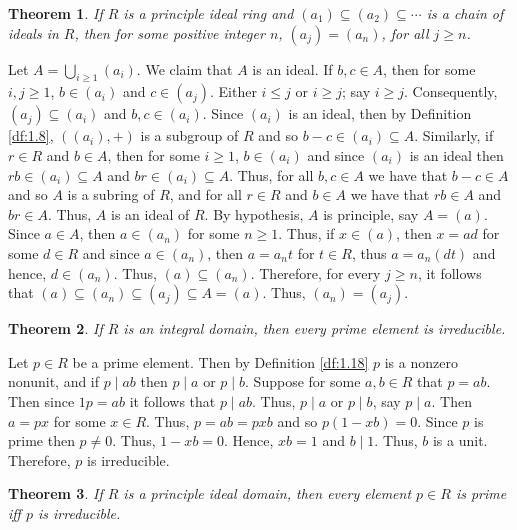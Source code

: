 \documentclass{article}
\makeatletter
\newtheorem{theorem}{Theorem}[section]
\theoremstyle{definition}
\theoremstyle{remark}
\let\oldproofname=\proofname
\renewcommand{\proofname}{\bf{\textit{\oldproofname}}}
\theoremstyle{definition}
\renewenvironment{proof}[1][\proofname]{\par
  \pushQED{\qed}%
  \normalfont \topsep6\p@\@plus6\p@\relax
  \list{}{\leftmargin=0mm
          \rightmargin=0mm
          \settowidth{\itemindent}{\itshape#1}%
          \labelwidth=4mm
          \parsep=0pt \listparindent=0mm%
  }
  \item[\hskip\labelsep
        \itshape
    #1\@addpunct{.}]\ignorespaces
}{%
  \popQED\endlist\@endpefalse
}
\makeatother
\begin{document}
    \begin{theorem}\label{thm:2.4}
        If $R$ is a principle ideal ring and $(a_1)\subseteq(a_2)\subseteq\cdots$ is a chain of ideals in $R$, then for some positive integer $n$, $(a_j)=(a_n)$, for all $j\geq n$.
    \end{theorem}
        \begin{proof}
            Let $A=\bigcup\limits_{i\geq 1} (a_i)$. We claim that $A$ is an ideal. If $b,c\in A$, then for some $i,j\geq 1$, $b\in (a_i)$ and $c\in (a_j)$. Either $i\leq j$ or $i\geq j$; say $i\geq j$. Consequently, $(a_j)\subseteq (a_i)$ and $b,c\in (a_i)$. Since $(a_i)$ is an ideal, then by Definition \ref{df:1.8}, $((a_i),+)$ is a subgroup of $R$ and so $b-c\in (a_i)\subseteq A$. Similarly, if $r\in R$ and $b\in A$, then for some $i\geq 1$, $b\in (a_i)$ and since $(a_i)$ is an ideal then $rb\in(a_i)\subseteq A$ and $br\in(a_i)\subseteq A$. Thus, for all $b,c\in A$ we have that $b-c\in A$ and so $A$ is a subring of $R$, and for all $r\in R$ and $b\in A$ we have that $rb\in A$ and $br\in A$. Thus, $A$ is an ideal of $R$. By hypothesis, $A$ is principle, say $A=(a)$. Since $a\in A$, then $a\in(a_n)$ for some $n\geq 1$. Thus, if $x\in (a)$, then $x=ad$ for some $d\in R$ and since $a\in (a_n)$, then $a=a_nt$ for $t\in R$, thus $a=a_n(dt)$ and hence, $d\in (a_n)$. Thus, $(a)\subseteq (a_n)$. Therefore, for every $j\geq n$, it follows that $(a)\subseteq (a_n)\subseteq (a_j)\subseteq A=(a)$. Thus, $(a_n)=(a_j)$.
        \end{proof}
        
    \begin{theorem}\label{thm:2.5}
        If $R$ is an integral domain, then every prime element is irreducible.
    \end{theorem}
        \begin{proof}
            Let $p\in R$ be a prime element. Then by Definition \ref{df:1.18} $p$ is a nonzero nonunit, and if $p\mid ab$ then $p\mid a$ or $p\mid b$. Suppose for some $a,b\in R$ that $p=ab$. Then since $1p=ab$ it follows that $p\mid ab$. Thus, $p\mid a$ or $p\mid b$, say $p\mid a$. Then $a=px$ for some $x\in R$. Thus, $p=ab=pxb$ and so $p(1-xb)=0$. Since $p$ is prime then $p\neq 0$. Thus, $1-xb=0$. Hence, $xb=1$ and $b\mid 1$. Thus, $b$ is a unit. Therefore, $p$ is irreducible.
        \end{proof}
        
    \begin{theorem}\label{thm:2.6}
        If $R$ is a principle ideal domain, then every element $p\in R$ is prime iff $p$ is irreducible.
    \end{theorem}
        \begin{proof}
        
        \end{proof}
        
\end{document}
